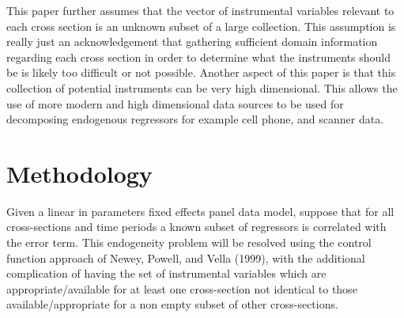 \documentclass[10pt]{article}
\begin{document}
\noindent This paper further assumes that the vector of instrumental variables relevant to each cross section is an unknown subset of a large collection. This assumption is really just an acknowledgement that gathering sufficient domain information regarding each cross section in order to determine what the instruments should be is likely too difficult or not possible. Another aspect of this paper is that this collection of potential instruments can be very high dimensional. This allows the use of more modern and high dimensional data sources to be used for decomposing endogenous regressors for example cell phone, and scanner data. \\

\section*{Methodology}


\noindent Given a linear in parameters fixed effects panel data model, suppose that for all cross-sections and time periods a known subset of regressors is correlated with the error term. This endogeneity problem will be resolved using the control function approach of Newey, Powell, and Vella (1999), with the additional complication of having the set of instrumental variables which are appropriate/available for at least one cross-section  not identical to those available/appropriate for a non empty subset of other cross-sections. 
\end{document}
